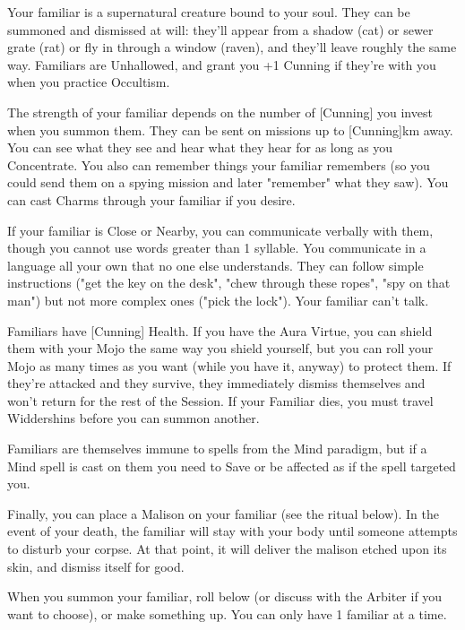 {\OCCULT[
  Name=Bind Familiar,
  Link=occultism-bind-familiar,
  Success=5+,
  Cost=666\FE
]

Your familiar is a supernatural creature bound to your soul.  They can be summoned and dismissed at will: they'll appear from a shadow (cat) or sewer grate (rat) or fly in through a window (raven), and they'll leave roughly the same way.  Familiars are Unhallowed, and grant you +1 Cunning if they're with you when you practice Occultism.  

The strength of your familiar depends on the number of [Cunning] you invest when you summon them.  They can be sent on missions up to [Cunning]km away. You can see what they see and hear what they hear for as long as you Concentrate. You also can remember things your familiar remembers (so you could send them on a spying mission and later "remember" what they saw). You can cast Charms through your familiar if you desire.

If your familiar is Close or Nearby, you can communicate verbally with them, though you cannot use words greater than 1 syllable.  You communicate in a language all your own that no one else understands.  They can follow simple instructions ("get the key on the desk", "chew through these ropes", "spy on that man") but not more complex ones ("pick the lock").  Your familiar can't talk.

Familiars have [Cunning] Health.  If you have the Aura Virtue, you can shield them with your Mojo the same way you shield yourself, but you can roll your Mojo as many times as you want (while you have it, anyway) to protect them.  If they're attacked and they survive, they immediately dismiss themselves and won't return for the rest of the Session. If your Familiar dies, you must travel Widdershins before you can summon another.  

Familiars are themselves immune to spells from the Mind paradigm, but if a Mind spell is cast on them you need to Save or be affected as if the spell targeted you.

Finally, you can place a Malison on your familiar (see the ritual below).  In the event of your death, the familiar will stay with your body until someone attempts to disturb your corpse.  At that point, it will deliver the malison etched upon its skin, and dismiss itself for good.

When you summon your familiar, roll below (or discuss with the Arbiter if you want to choose), or make something up.  You can only have 1 familiar at a time.



}
